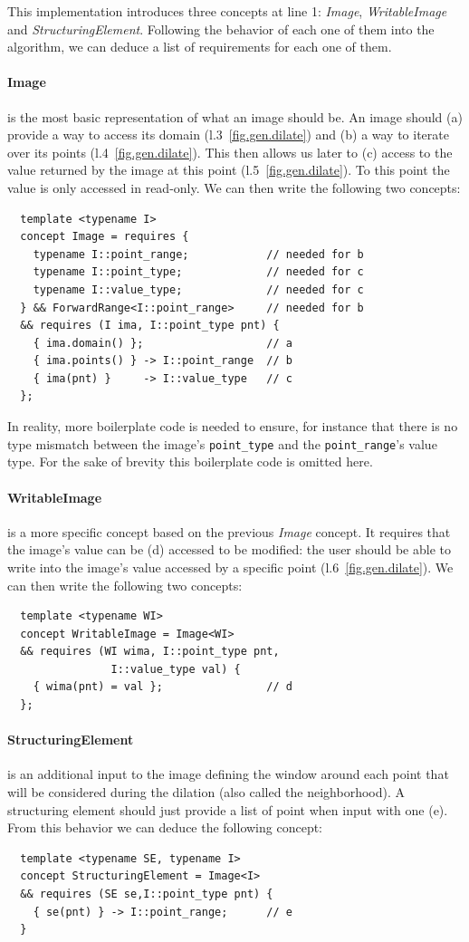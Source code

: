 This implementation introduces three concepts at line 1: \emph{Image}, \emph{WritableImage} and
\emph{StructuringElement}. Following the behavior of each one of them into the algorithm, we can deduce a list of
requirements for each one of them.

\paragraph{Image} is the most basic representation of what an image should be. An image should (a) provide a way to
access its domain (l.3~\ref{fig.gen.dilate}) and (b) a way to iterate over its points (l.4~\ref{fig.gen.dilate}). This
then allows us later to (c) access to the value returned by the image at this point (l.5~\ref{fig.gen.dilate}). To this
point the value is only accessed in read-only. We can then write the following two concepts:
\begin{verbatim}
  template <typename I>
  concept Image = requires {
    typename I::point_range;            // needed for b
    typename I::point_type;             // needed for c
    typename I::value_type;             // needed for c
  } && ForwardRange<I::point_range>     // needed for b
  && requires (I ima, I::point_type pnt) {
    { ima.domain() };                   // a
    { ima.points() } -> I::point_range  // b
    { ima(pnt) }     -> I::value_type   // c
  };
\end{verbatim}
In reality, more boilerplate code is needed to ensure, for instance that there is no type mismatch between the image's
\texttt{point\_type} and the \texttt{point\_range}'s value type. For the sake of brevity this boilerplate code is
omitted here.

\paragraph{WritableImage} is a more specific concept based on the previous \emph{Image} concept. It requires that the
image's value can be (d) accessed to be modified: the user should be able to write into the image's value accessed by a
specific point (l.6~\ref{fig.gen.dilate}). We can then write the following two concepts:
\begin{verbatim}
  template <typename WI>
  concept WritableImage = Image<WI>
  && requires (WI wima, I::point_type pnt,
                I::value_type val) {
    { wima(pnt) = val };                // d
  };
\end{verbatim}

\paragraph{StructuringElement} is an additional input to the image defining the window around each point that will be
considered during the dilation (also called the neighborhood). A structuring element should just provide a list of point
when input with one (e). From this behavior we can deduce the following concept:
\begin{verbatim}
  template <typename SE, typename I>
  concept StructuringElement = Image<I>
  && requires (SE se,I::point_type pnt) {
    { se(pnt) } -> I::point_range;      // e
  }
\end{verbatim}

